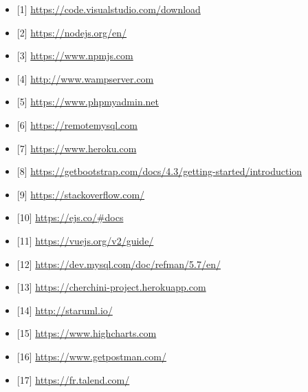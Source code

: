 \begin{itemize}
  \item {[1]  \url{https://code.visualstudio.com/download }  }
  \bigskip
  \item { [2]  \url{https://nodejs.org/en/ }  }
  \bigskip
  \item {  [3]  \url{https://www.npmjs.com} }
  \bigskip
  \item {  [4]  \url{http://www.wampserver.com}}
  \bigskip
  \item {  [5]  \url{https://www.phpmyadmin.net}  }
  \bigskip
  \item {  [6]  \url{https://remotemysql.com}  }
  \bigskip
  \item {  [7]  \url{https://www.heroku.com}  }
  \bigskip
  \item { [8]  \url{https://getbootstrap.com/docs/4.3/getting-started/introduction}   }
  \bigskip
  \item { [9]  \url{https://stackoverflow.com/} }
  \bigskip
  \item {  [10] \url{https://ejs.co/#docs} }
  \bigskip
  \item {  [11] \url{https://vuejs.org/v2/guide/} }
  \bigskip
  \item {  [12] \url{https://dev.mysql.com/doc/refman/5.7/en/}  }
  \bigskip
  \item {   [13] \url{https://cherchini-project.herokuapp.com} }
  \bigskip
  \item {   [14] \url{http://staruml.io/}  }
  \bigskip
  \item {   [15] \url{https://www.highcharts.com}  }
  \bigskip
  \item {  [16] \url{https://www.getpostman.com/} }
  \bigskip
  \item {  [17] \url{https://fr.talend.com/} }
 \end{itemize} 